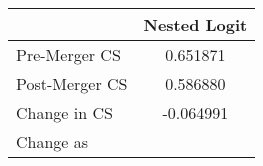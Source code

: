 \begin{tabular}{lc}
\hline
& Nested Logit \\
\hline
Pre-Merger CS & 0.651871 \\
Post-Merger CS & 0.586880 \\
Change in CS & -0.064991 \\
Change as %
\hline
\end{tabular}